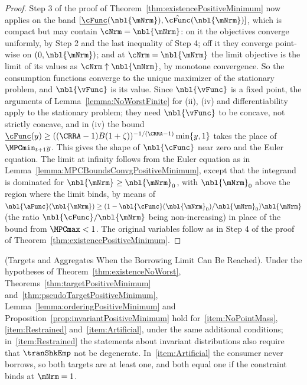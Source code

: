 \documentclass[\econtexRoot/BufferStockTheory]{subfiles}
\begin{document}
\begin{proof}
Step 3 of the proof of Theorem~\ref{thm:existencePositiveMinimum} now applies on the band $[\underline{\cFunc}(\nbl{\mNrm}),\hat{\cFunc}(\nbl{\mNrm})]$, which is compact but may contain $\cNrm=\nbl{\mNrm}$: on it the objectives converge uniformly, by Step 2 and the last inequality of Step 4; off it they converge point-wise on $(0,\nbl{\mNrm})$; and at $\cNrm=\nbl{\mNrm}$ the limit objective is the limit of its values as $\cNrm\uparrow\nbl{\mNrm}$, by monotone convergence.
So the consumption functions converge to the unique maximizer of the stationary problem, and $\nbl{\vFunc}$ is its value.
Since $\nbl{\vFunc}$ is a fixed point, the arguments of Lemma~\ref{lemma:NoWorstFinite} for (ii), (iv) and differentiability apply to the stationary problem; they need $\nbl{\vFunc}$ to be concave, not strictly concave, and in (iv) the bound $\underline{\cFunc}(y)\geq((\CRRA-1)B(1+\zeta))^{-1/(\CRRA-1)}\min\{y,1\}$ takes the place of $\MPCmin_{t+1}y$.
This gives the shape of $\nbl{\cFunc}$ near zero and the Euler equation.
The limit at infinity follows from the Euler equation as in Lemma~\ref{lemma:MPCBoundsConvgPositiveMinimum}, except that the integrand is dominated for $\nbl{\mNrm}\geq\nbl{\mNrm}_{0}$, with $\nbl{\mNrm}_{0}$ above the region where the limit binds, by means of $\nbl{\aFunc}(\nbl{\mNrm})\geq(1-\nbl{\cFunc}(\nbl{\mNrm}_{0})/\nbl{\mNrm}_{0})\nbl{\mNrm}$ (the ratio $\nbl{\cFunc}/\nbl{\mNrm}$ being non-increasing) in place of the bound from $\MPCmax<1$.
The original variables follow as in Step 4 of the proof of Theorem~\ref{thm:existencePositiveMinimum}.
\end{proof}

\begin{proposition}(Targets and Aggregates When the Borrowing Limit Can Be Reached).\label{prop:NoWorstTargets}
Under the hypotheses of Theorem~\ref{thm:existenceNoWorst}, Theorems~\ref{thm:targetPositiveMinimum} and~\ref{thm:pseudoTargetPositiveMinimum}, Lemma~\ref{lemma:orderingPositiveMinimum} and Proposition~\ref{prop:invariantPositiveMinimum} hold for~\ref{item:NoPointMass}, \ref{item:Restrained} and~\ref{item:Artificial}, under the same additional conditions; in~\ref{item:Restrained} the statements about invariant distributions also require that $\tranShkEmp$ not be degenerate.
In~\ref{item:Artificial} the consumer never borrows, so both targets are at least one, and both equal one if the constraint binds at $\mNrm=1$.
\end{proposition}
\end{document}
